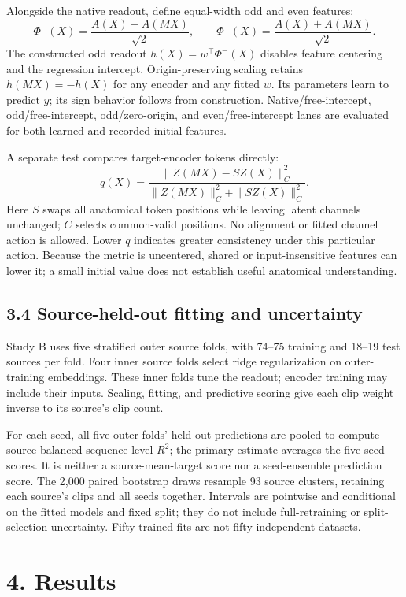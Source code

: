 \documentclass{article}
\begin{document}
Alongside the native readout, define equal-width odd and even features:
\[
\Phi^-(X)=\frac{A(X)-A(MX)}{\sqrt{2}},\qquad
\Phi^+(X)=\frac{A(X)+A(MX)}{\sqrt{2}}.
\] The constructed odd readout \(h(X)=w^\top\Phi^-(X)\) disables feature
centering and the regression intercept. Origin-preserving scaling
retains \(h(MX)=-h(X)\) for any encoder and any fitted \(w\). Its
parameters learn to predict \(y\); its sign behavior follows from
construction. Native/free-intercept, odd/free-intercept,
odd/zero-origin, and even/free-intercept lanes are evaluated for both
learned and recorded initial features.

A separate test compares target-encoder tokens directly: \[
q(X)=\frac{\|Z(MX)-SZ(X)\|_C^2}
{\|Z(MX)\|_C^2+\|SZ(X)\|_C^2}.
\] Here \(S\) swaps all anatomical token positions while leaving latent
channels unchanged; \(C\) selects common-valid positions. No alignment
or fitted channel action is allowed. Lower \(q\) indicates greater
consistency under this particular action. Because the metric is
uncentered, shared or input-insensitive features can lower it; a small
initial value does not establish useful anatomical understanding.

\subsection{3.4 Source-held-out fitting and
uncertainty}\label{source-held-out-fitting-and-uncertainty}

Study B uses five stratified outer source folds, with 74--75 training
and 18--19 test sources per fold. Four inner source folds select ridge
regularization on outer-training embeddings. These inner folds tune the
readout; encoder training may include their inputs. Scaling, fitting,
and predictive scoring give each clip weight inverse to its source's
clip count.

For each seed, all five outer folds' held-out predictions are pooled to
compute source-balanced sequence-level \(R^2\); the primary estimate
averages the five seed scores. It is neither a source-mean-target score
nor a seed-ensemble prediction score. The 2,000 paired bootstrap draws
resample 93 source clusters, retaining each source's clips and all seeds
together. Intervals are pointwise and conditional on the fitted models
and fixed split; they do not include full-retraining or split-selection
uncertainty. Fifty trained fits are not fifty independent datasets.

\section{4. Results}\label{results}
\end{document}
